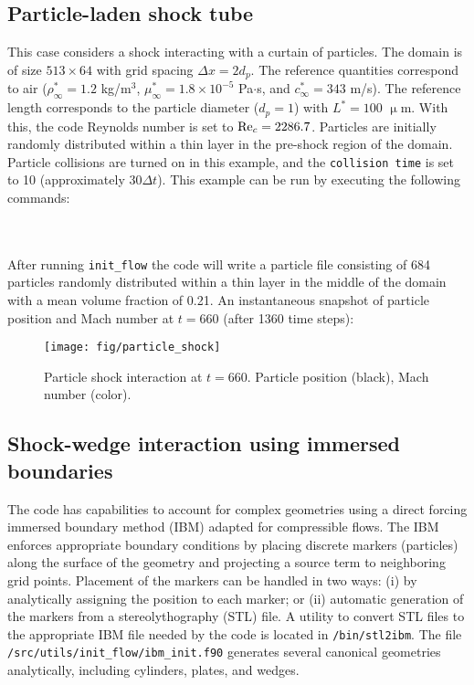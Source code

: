 \documentclass[12pt]{article}
\newcommand{\code}[1]{\texttt{#1}}
\begin{document}
\subsection{Particle-laden shock tube}
This case considers a shock interacting with a curtain of particles. The domain is of size $513\times 64$ with grid spacing $\Delta x = 2d_p$. The reference quantities correspond to air ($\rho_\infty^*=1.2$ kg/m$^3$, $\mu_\infty^*=1.8\times 10^{-5}$ Pa$\cdot$s, and $c_\infty^*=343$ m/s). The reference length corresponds to the particle diameter ($d_p=1$) with $L^*=100$ $\upmu$m. With this, the code Reynolds number is set to ${\rm Re}_c=2286.7$. Particles are initially randomly distributed within a thin layer in the pre-shock region of the domain. Particle collisions are turned on in this example, and the \code{collision time} is set to 10 (approximately $30\Delta t$). This example can be run by executing the following commands:
\\\\
\vspace{1em}
\vspace{.5em}
\\
After running \code{init\_flow} the code will write a particle file consisting of 684 particles randomly distributed within a thin layer in the middle of the domain with a mean volume fraction of 0.21. An instantaneous snapshot of particle position and Mach number at $t=660$ (after 1360 time steps):
 \begin{figure}[h]
	\begin{center}
		\texttt{[image: fig/particle\_shock]}
		\caption{Particle shock interaction at $t=660$. Particle position (black), Mach number (color).}
		\label{fig:sod}
	\end{center}
\end{figure}

\subsection{Shock-wedge interaction using immersed boundaries}
The code has capabilities to account for complex geometries using a direct forcing immersed boundary method (IBM) adapted for compressible flows. The IBM enforces appropriate boundary conditions by placing discrete markers (particles) along the surface of the geometry and projecting a source term to neighboring grid points. Placement of the markers can be handled in two ways: (i) by analytically assigning the position to each marker; or (ii) automatic generation of the markers from a stereolythography (STL) file. A utility to convert STL files to the appropriate IBM file needed by the code is located in \code{/bin/stl2ibm}. The file \code{/src/utils/init\_flow/ibm\_init.f90} generates several canonical geometries analytically, including cylinders, plates, and wedges.
\end{document}
